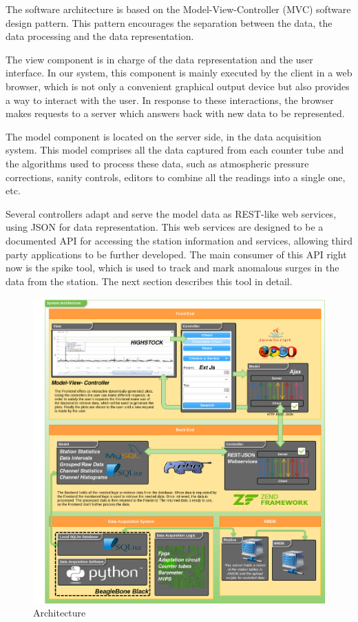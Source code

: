 \documentclass[a4paper]{jpconf}
\begin{document}
The software architecture is based on the Model-View-Controller (MVC) software
design pattern\cite{wiki:MVC}. This pattern encourages the separation between
the data, the data processing and the data representation. 

The view component is in charge of the data representation and the user
interface. In our system, this component is mainly executed by the client in a
web browser, which is not only a convenient graphical output device but
also provides a way to interact with the user. In response to these
interactions, the browser makes requests to a server which answers back with new
data to be represented.

The model component is located on the server side, in the data acquisition
system. This model comprises all the data captured from each counter tube and
the algorithms used to process these data, such as atmospheric pressure
corrections, sanity controls, editors to combine all the readings into a single
one, etc.

Several controllers adapt and serve the model data as REST-like web services,
using JSON for data representation. This web services are designed to be a
documented API for accessing the station information and services, allowing
third party applications to be further developed. The main consumer of this API
right now is the spike tool, which is used to track and mark anomalous surges in
the data from the station. The next section describes this tool in detail.

\begin{figure}[h]
    \centering
    \includegraphics[keepaspectratio, width=1\textwidth]{./resources/Architecture.png}
    \caption{Architecture}
    \label{fig:arch}
\end{figure}
\end{document}
